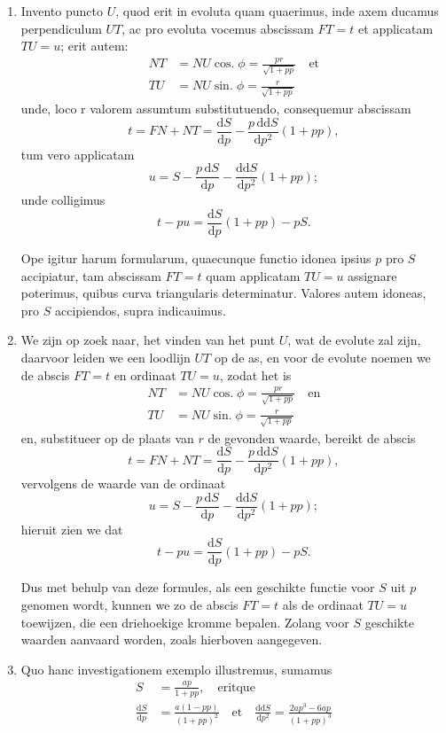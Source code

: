 \documentclass[10pt,a4paper]{article}
\newcommand{\switchenum}{\setcounter{enumi}{\arabic{enumi}-1}\switchcolumn}
\DeclareMathOperator{\sing}{sin.}
\DeclareMathOperator{\cosg}{cos.}
\def\D{\mathrm{d}}
\begin{document}
\begin{paracol}{2}
\begin{enumerate}[topsep=1px]
		\switchcolumn*
		\newpage
		
		\item Invento puncto $U$, quod erit in evoluta quam quaerimus, inde axem ducamus perpendiculum $UT$, ac pro evoluta vocemus abscissam $FT=t$ et applicatam $TU=u$; erit autem:
		\begin{align*}
			NT &= NU \cosg \phi = \frac{pr}{\sqrt{1+pp}} \quad \text{et}\\
			TU &= NU \sing \phi = \frac{r}{\sqrt{1+pp}}
		\end{align*}
		unde, loco r valorem assumtum substitutuendo, consequemur abscissam
		\[
			t = FN + NT = \frac{\D S}{\D p} - \frac{p\,\D\D S}{\D p^2} (1+pp),
		\]
		tum vero applicatam
		\[
			u = S - \frac{p\, \D S}{\D p}-\frac{\D \D S}{\D p^2}(1+pp);
		\]
		unde colligimus
		\[
			t-pu = \frac{\D S}{\D p}(1+pp)-pS.
		\]
		\par Ope igitur harum formularum, quaecunque functio idonea ipsius $p$ pro $S$ accipiatur, tam abscissam $FT = t$ quam applicatam $TU=u$ assignare poterimus, quibus curva triangularis determinatur. Valores autem idoneas, pro $S$ accipiendos, supra indicauimus.
		
		\switchenum
		\newpage
		\item We zijn op zoek naar, het vinden van het punt $U$, wat de evolute zal zijn, daarvoor leiden we een loodlijn $UT$ op de as, en voor de evolute noemen we de abscis $FT=t$ en ordinaat $TU=u$, zodat het is
		\begin{align*}
			NT &= NU \cosg \phi = \frac{pr}{\sqrt{1+pp}} \quad \text{en}\\
			TU &= NU \sing \phi = \frac{r}{\sqrt{1+pp}}
		\end{align*}
		en, substitueer op de plaats van $r$ de gevonden waarde, bereikt de abscis
		\[
			t = FN + NT = \frac{\D S}{\D p} - \frac{p\,\D\D S}{\D p^2} (1+pp),
		\]
		vervolgens de waarde van de ordinaat
		\[
			u = S - \frac{p\, \D S}{\D p}-\frac{\D \D S}{\D p^2}(1+pp);
		\]
		hieruit zien we dat
		\[
			t-pu = \frac{\D S}{\D p}(1+pp)-pS.
		\]
		\par Dus met behulp van deze formules, als een geschikte functie voor $S$ uit $p$ genomen wordt, kunnen we zo de abscis $FT=t$ als de ordinaat $TU=u$ toewijzen, die een driehoekige kromme bepalen. Zolang voor $S$ geschikte waarden aanvaard worden, zoals hierboven aangegeven.
		
		\switchcolumn*
		
		\item Quo hanc investigationem exemplo illustremus, sumamus
		\begin{align*}
			S &= \frac{ap}{1+pp}, \quad\text{eritque}\\
			\frac{\D S}{\D p} &= \frac{a(1-pp)}{(1+pp)^2} \quad \text{et} \quad \frac{\D \D S}{\D p^2} = \frac{2ap^3-6ap}{(1+pp)^3}
		\end{align*}


\end{enumerate}
\end{paracol}
\end{document}
